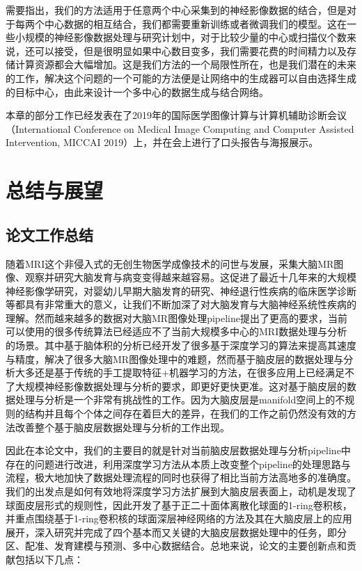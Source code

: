 需要指出，我们的方法适用于任意两个中心采集到的神经影像数据的结合，但是对于每两个中心数据的相互结合，我们都需要重新训练或者微调我们的模型。这在一些小规模的神经影像数据处理与研究计划中，对于比较少量的中心或扫描仪个数来说，还可以接受，但是很明显如果中心数目变多，我们需要花费的时间精力以及存储计算资源都会大幅增加。这是我们方法的一个局限性所在，也是我们潜在的未来的工作，解决这个问题的一个可能的方法便是让网络中的生成器可以自由选择生成的目标中心，由此来设计一个多中心的数据生成与结合网络。

本章的部分工作已经发表在了2019年的国际医学图像计算与计算机辅助诊断会议（International Conference on Medical Image Computing and Computer Assisted Intervention, MICCAI 2019）上，并在会上进行了口头报告与海报展示。










\chapter{总结与展望}

\section{论文工作总结}
随着MRI这个非侵入式的无创生物医学成像技术的问世与发展，采集大脑MR图像、观察并研究大脑发育与病变变得越来越容易。这促进了最近十几年来的大规模神经影像学研究，对婴幼儿早期大脑发育的研究、神经退行性疾病的临床医学诊断等都具有非常重大的意义，让我们不断加深了对大脑发育与大脑神经系统性疾病的理解。然而越来越多的数据对大脑MR图像处理pipeline提出了更高的要求，当前可以使用的很多传统算法已经适应不了当前大规模多中心的MRI数据处理与分析的场景。其中基于脑体积的分析已经开发了很多基于深度学习的算法来提高其速度与精度，解决了很多大脑MR图像处理中的难题，然而基于脑皮层的数据处理与分析大多还是基于传统的手工提取特征+机器学习的方法，在很多应用上已经满足不了大规模神经影像数据处理与分析的要求，即更好更快更准。这对基于脑皮层的数据处理与分析是一个非常有挑战性的工作。因为大脑皮层是manifold空间上的不规则的结构并且每个个体之间存在着巨大的差异，在我们的工作之前仍然没有效的方法改善整个基于脑皮层数据处理与分析的工作出现。

因此在本论文中，我们的主要目的就是针对当前脑皮层数据处理与分析pipeline中存在的问题进行改进，利用深度学习方法从本质上改变整个pipeline的处理思路与流程，极大地加快了数据处理流程的同时也获得了相比当前方法高地多的准确度。我们的出发点是如何有效地将深度学习方法扩展到大脑皮层表面上，动机是发现了球面皮层形式的规则性，因此开发了基于正二十面体离散化球面的1-ring卷积核，并重点围绕基于1-ring卷积核的球面深层神经网络的方法及其在大脑皮层上的应用展开，深入研究并完成了四个基本而又关键的大脑皮层数据处理中的任务，即分区、配准、发育建模与预测、多中心数据结合。总地来说，论文的主要创新点和贡献包括以下几点：

